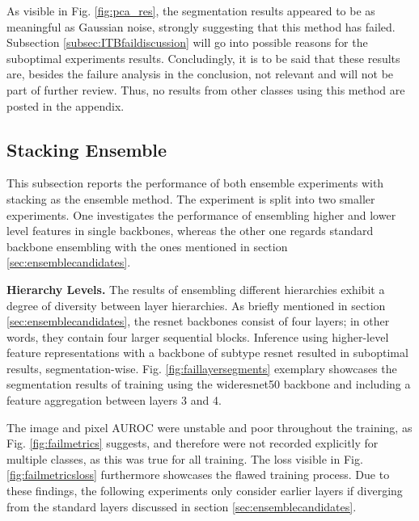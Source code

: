 As visible in Fig. \ref{fig:pca_res}, the segmentation results appeared to be as meaningful as Gaussian noise, strongly suggesting that this method has failed. Subsection 
\ref{subsec:ITBfaildiscussion} will go into possible reasons for the suboptimal experiments results. Concludingly, it is to be said that these results are, besides the failure analysis 
in the conclusion, not relevant and will not be part of further review. Thus, no results from other classes using this method are posted in the appendix.

\subsection{Stacking Ensemble}
\label{subsec:stacking}
This subsection reports the performance of both ensemble experiments with stacking as the ensemble method. 
The experiment is split into two smaller experiments. One investigates the performance of ensembling higher and lower level features in 
single backbones, whereas the other one regards standard backbone ensembling with the ones mentioned in section \ref{sec:ensemblecandidates}. 






\textbf{Hierarchy Levels.} The results of ensembling different hierarchies exhibit a degree of diversity between layer hierarchies. As briefly mentioned in section \ref{sec:ensemblecandidates}, the resnet backbones consist of four 
layers; in other words, they contain four larger sequential blocks. Inference using higher-level feature representations with a backbone of subtype resnet resulted in suboptimal results, segmentation-wise. 
Fig. \ref{fig:faillayersegments} exemplary showcases the segmentation results of training using the wideresnet50 backbone and including a feature aggregation between layers 3 and 4. 



The image and pixel AUROC were unstable and poor throughout the training, 
as Fig. \ref{fig:failmetrics} suggests, and therefore were not recorded explicitly for multiple classes, as this was true for all training. The loss visible in Fig. \ref{fig:failmetricsloss} furthermore 
showcases the flawed training process. Due to these findings, the following experiments only consider earlier layers if diverging from the standard layers 
discussed in section \ref{sec:ensemblecandidates}.

